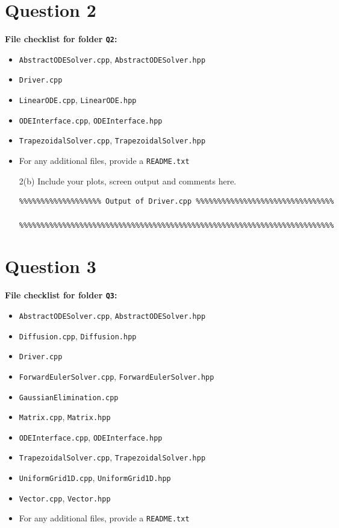 \documentclass[a4,10pt,fleqn]{article}  %
\newcommand{\il}[1]{\texttt{#1}}
\begin{document}
\clearpage

\section*{Question 2}

\textbf{File checklist for folder \il{Q2}:}
\begin{itemize}
  \item \il{AbstractODESolver.cpp}, \il{AbstractODESolver.hpp}
  \item \il{Driver.cpp}
  \item \il{LinearODE.cpp}, \il{LinearODE.hpp}
  \item \il{ODEInterface.cpp}, \il{ODEInterface.hpp}
  \item \il{TrapezoidalSolver.cpp}, \il{TrapezoidalSolver.hpp}
  \item For any additional files, provide a \il{README.txt}
\end{itemize}

\vspace{10mm}
\begin{itemize}

\item[2(b)] Include your plots, screen output and comments here.

\begin{verbatim}
%%%%%%%%%%%%%%%%%%% Output of Driver.cpp %%%%%%%%%%%%%%%%%%%%%%%%%%%%%%%%

%%%%%%%%%%%%%%%%%%%%%%%%%%%%%%%%%%%%%%%%%%%%%%%%%%%%%%%%%%%%%%%%%%%%%%%%%
\end{verbatim}

\end{itemize}

\clearpage

\section*{Question 3}

\textbf{File checklist for folder \il{Q3}:}
\begin{itemize}
  \item \il{AbstractODESolver.cpp}, \il{AbstractODESolver.hpp}
  \item \il{Diffusion.cpp}, \il{Diffusion.hpp}
  \item \il{Driver.cpp}
  \item \il{ForwardEulerSolver.cpp}, \il{ForwardEulerSolver.hpp}
  \item \il{GaussianElimination.cpp}
  \item \il{Matrix.cpp}, \il{Matrix.hpp}
  \item \il{ODEInterface.cpp}, \il{ODEInterface.hpp}
  \item \il{TrapezoidalSolver.cpp}, \il{TrapezoidalSolver.hpp}
  \item \il{UniformGrid1D.cpp}, \il{UniformGrid1D.hpp}
  \item \il{Vector.cpp}, \il{Vector.hpp}
  \item For any additional files, provide a \il{README.txt}
\end{itemize}
\end{document}
